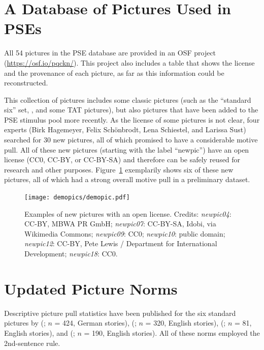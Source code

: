 \documentclass[man,a4paper,mask]{apa6}\usepackage[]{graphicx}\usepackage[]{color}
\begin{document}
\section{A Database of Pictures Used in PSEs}

All 54 pictures in the PSE database are provided in an OSF project (\url{https://osf.io/pqckn/}). This project also includes a table that shows the license and the provenance of each picture, as far as this information could be reconstructed. 

This collection of pictures includes some classic pictures (such as the ``standard six'' set, , and some TAT pictures), but also pictures that have been added to the PSE stimulus pool more recently. As the license of some pictures is not clear, four experts (Birk Hagemeyer, Felix Schönbrodt, Lena Schiestel, and Larissa Sust) searched for 30 new pictures, all of which promised to have a considerable motive pull. All of these new pictures (starting with the label ``newpic'') have an open license (CC0, CC-BY, or CC-BY-SA) and therefore can be safely reused for research and other purposes. Figure~\ref{fig:demopic} exemplarily shows six of these new pictures, all of which had a strong overall motive pull in a preliminary dataset.


\begin{figure}[htp]
  \begin{center}
	\texttt{[image: demopics/demopic.pdf]}
  \end{center}
  \caption{Examples of new pictures with an open license. Credits: \emph{newpic04}: CC-BY, MBWA PR GmbH; \emph{newpic07}: CC-BY-SA, Idobi, via Wikimedia Commons; \emph{newpic09}: CC0; \emph{newpic10}: public domain; \emph{newpic12}: CC-BY, Pete Lewis / Department for International Development; \emph{newpic18}: CC0.}
  \label{fig:demopic}
\end{figure}


\section{Updated Picture Norms}

Descriptive picture pull statistics have been published for the six standard pictures by \citeauthor{schultheiss_AssessmentImplicitMotives_2001} (\citeyear{schultheiss_AssessmentImplicitMotives_2001}; $n$ = 424, German stories), \citeauthor{pang_assessing_2005} (\citeyear{pang_assessing_2005}; $n$ = 320, English stories), \citeauthor{pang_ContentCodingMethods_2010} (\citeyear{pang_ContentCodingMethods_2010}; $n$ = 81, English stories), and \citeauthor{schultheiss_AreImplicitExplicit_2009} (\citeyear{schultheiss_AreImplicitExplicit_2009}; $n$ = 190, English stories). All of these norms employed the 2nd-sentence rule.
\end{document}
